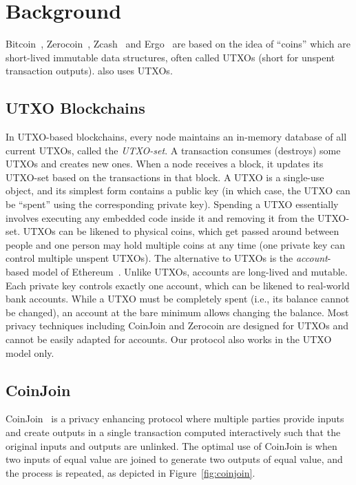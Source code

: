 \documentclass[runningheads]{llncs}
\begin{document}
\section{Background}

Bitcoin~\cite{Nak08}, Zerocoin~\cite{zerocoin}, Zcash~\cite{zcash} and Ergo~\cite{ergo} are based on the idea of ``coins'' which are short-lived immutable data structures, often called UTXOs (short for {unspent transaction outputs}). \algname also uses UTXOs. 

\subsection{UTXO Blockchains}
In UTXO-based blockchains, every node maintains an in-memory database of all current UTXOs, called the {\em UTXO-set}. A transaction consumes (destroys) some UTXOs and creates new ones. When a node receives a block, it updates its UTXO-set based on the transactions in that block. A UTXO is a single-use object, and its simplest form contains a public key (in which case, the UTXO can be ``spent'' using the corresponding private key). Spending a UTXO essentially involves executing any embedded code inside it and removing it from the UTXO-set. UTXOs can be likened to physical coins, which get passed around between people and one person may hold multiple coins at any time (one private key can control multiple unspent UTXOs). 
The alternative to UTXOs is the {\em account}-based model of Ethereum~\cite{wood2014ethereum}. Unlike UTXOs, accounts are long-lived and mutable. Each private key controls exactly one account, which can be likened to real-world bank accounts. While a UTXO must be completely spent (i.e., its balance cannot be changed), an account at the bare minimum allows changing the balance. Most privacy techniques including CoinJoin and Zerocoin are designed for UTXOs and cannot be easily adapted for accounts. Our protocol also works in the UTXO model only. %

\subsection{CoinJoin} 
\label{coinjoin}
CoinJoin~\cite{coinjoin} is a privacy enhancing protocol where multiple parties provide inputs and create outputs in a single transaction computed interactively such that the original inputs and outputs are unlinked. The optimal use of CoinJoin is when two inputs of equal value are joined to generate two outputs of equal value, and the process is repeated, as depicted in Figure~\ref{fig:coinjoin}. 
\end{document}
